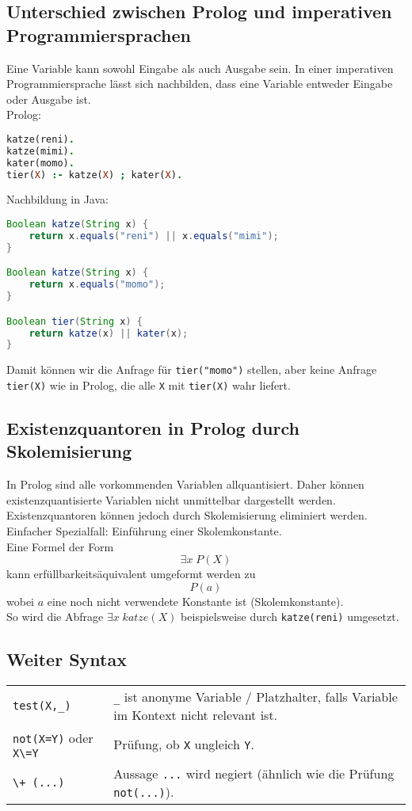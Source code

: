 \subsection{Unterschied zwischen Prolog und imperativen Programmiersprachen}
Eine Variable kann sowohl Eingabe als auch Ausgabe sein. In einer imperativen Programmiersprache lässt sich nachbilden, dass eine Variable entweder Eingabe oder Ausgabe ist.\\
Prolog:
\begin{lstlisting}[language=Prolog]
katze(reni).
katze(mimi).
kater(momo).
tier(X) :- katze(X) ; kater(X).
\end{lstlisting}
Nachbildung in Java:
\begin{lstlisting}[language=Java]
Boolean katze(String x) {
	return x.equals("reni") || x.equals("mimi");
}

Boolean katze(String x) {
	return x.equals("momo");
}

Boolean tier(String x) {
	return katze(x) || kater(x);
}
\end{lstlisting}
Damit können wir die Anfrage für \lstinline$tier("momo")$ stellen, aber keine Anfrage \lstinline$tier(X)$ wie in Prolog, die alle \lstinline$X$ mit \lstinline$tier(X)$ wahr liefert.

\subsection{Existenzquantoren in Prolog durch Skolemisierung}
In Prolog sind alle vorkommenden Variablen allquantisiert. Daher können existenzquantisierte Variablen nicht unmittelbar dargestellt werden. Existenzquantoren können jedoch durch Skolemisierung eliminiert werden. Einfacher Spezialfall: Einführung einer Skolemkonstante.\\
Eine Formel der Form
$$\exists x\; P(X)$$
kann erfüllbarkeitsäquivalent umgeformt werden zu
$$P(a)$$
wobei $a$ eine noch nicht verwendete Konstante ist (Skolemkonstante).\\
So wird die Abfrage $\exists x\; katze(X)$ beispielsweise durch \lstinline$katze(reni)$ umgesetzt.

\subsection{Weiter Syntax}
\begin{tabular}{L{.3} L{.7}}
\lstinline$test(X,_)$ & \lstinline$_$ ist anonyme Variable / Platzhalter, falls Variable im Kontext nicht relevant ist.\\
\lstinline$not(X=Y)$ oder \lstinline$X\=Y$ & Prüfung, ob \lstinline$X$ ungleich \lstinline$Y$.\\
\lstinline$\+ (...)$ & Aussage \lstinline$...$ wird negiert (ähnlich wie die Prüfung \lstinline$not(...)$).
\end{tabular}


